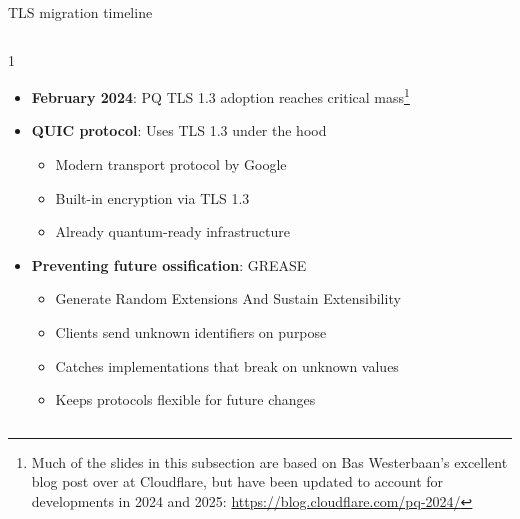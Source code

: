 \documentclass[aspectratio=169, lualatex]{beamer} %
\begin{document}
\begin{frame}{TLS migration timeline}
	\begin{columns}[c]
		\begin{column}{1\textwidth}
			\begin{itemize}
				\item \textbf{February 2024}: PQ TLS 1.3 adoption reaches critical mass\footnote{Much of the slides in this subsection are based on Bas Westerbaan's excellent blog post over at Cloudflare, but have been updated to account for developments in 2024 and 2025: \url{https://blog.cloudflare.com/pq-2024/}}
				\item \textbf{QUIC protocol}: Uses TLS 1.3 under the hood
				      \begin{itemize}
					      \item Modern transport protocol by Google
					      \item Built-in encryption via TLS 1.3
					      \item Already quantum-ready infrastructure
				      \end{itemize}
				\item \textbf{Preventing future ossification}: GREASE
				      \begin{itemize}
					      \item Generate Random Extensions And Sustain Extensibility
					      \item Clients send unknown identifiers on purpose
					      \item Catches implementations that break on unknown values
					      \item Keeps protocols flexible for future changes
				      \end{itemize}
			\end{itemize}
		\end{column}
	\end{columns}
\end{frame}
\end{document}
